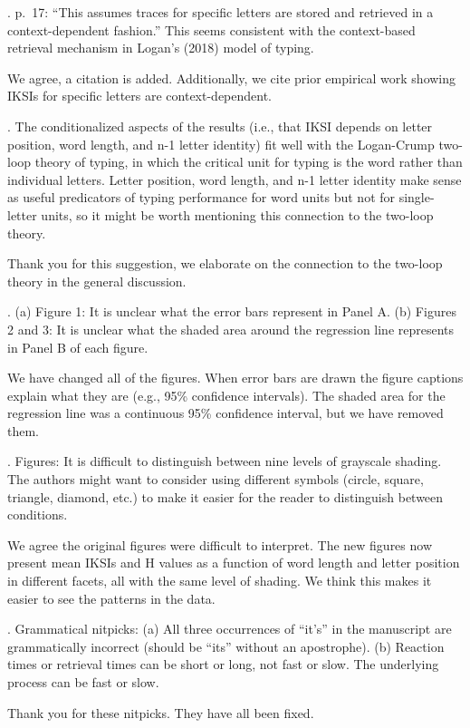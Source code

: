 \documentclass[draft]{article}
\begin{document}
. p.~17: ``This assumes traces for specific letters are stored and retrieved in a context-dependent fashion.'' This seems consistent with the context-based retrieval mechanism in Logan's (2018) model of typing.

We agree, a citation is added. Additionally, we cite prior empirical work showing IKSIs for specific letters are context-dependent.

. The conditionalized aspects of the results (i.e., that IKSI depends on letter position, word length, and n-1 letter identity) fit well with the Logan-Crump two-loop theory of typing, in which the critical unit for typing is the word rather than individual letters. Letter position, word length, and n-1 letter identity make sense as useful predicators of typing performance for word units but not for single-letter units, so it might be worth mentioning this connection to the two-loop theory.

Thank you for this suggestion, we elaborate on the connection to the two-loop theory in the general discussion.

. (a) Figure 1: It is unclear what the error bars represent in Panel A. (b) Figures 2 and 3: It is unclear what the shaded area around the regression line represents in Panel B of each figure.

We have changed all of the figures. When error bars are drawn the figure captions explain what they are (e.g., 95\% confidence intervals). The shaded area for the regression line was a continuous 95\% confidence interval, but we have removed them.

. Figures: It is difficult to distinguish between nine levels of grayscale shading. The authors might want to consider using different symbols (circle, square, triangle, diamond, etc.) to make it easier for the reader to distinguish between conditions.

We agree the original figures were difficult to interpret. The new figures now present mean IKSIs and H values as a function of word length and letter position in different facets, all with the same level of shading. We think this makes it easier to see the patterns in the data.

. Grammatical nitpicks: (a) All three occurrences of ``it's'' in the manuscript are grammatically incorrect (should be ``its'' without an apostrophe). (b) Reaction times or retrieval times can be short or long, not fast or slow. The underlying process can be fast or slow.

Thank you for these nitpicks. They have all been fixed.
\end{document}
